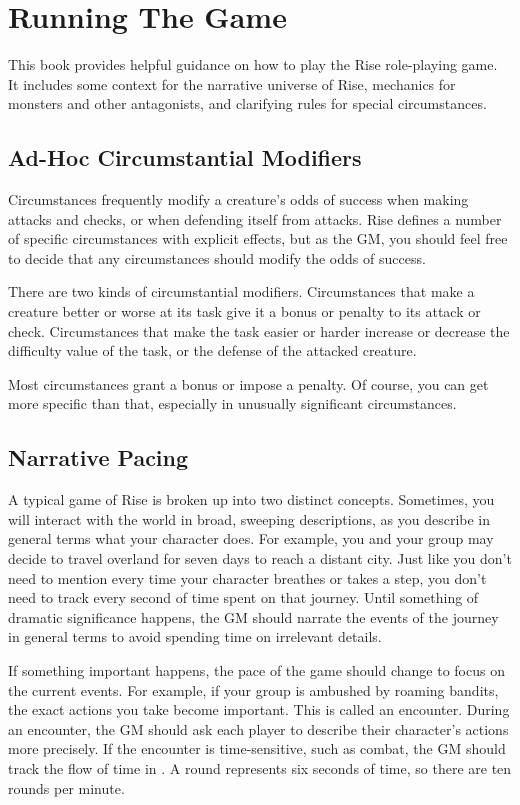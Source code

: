 \chapter{Running The Game}

This book provides helpful guidance on how to play the Rise role-playing game.
It includes some context for the narrative universe of Rise, mechanics for monsters and other antagonists, and clarifying rules for special circumstances.

\section{Ad-Hoc Circumstantial Modifiers}
    Circumstances frequently modify a creature's odds of success when making attacks and checks, or when defending itself from attacks.
    Rise defines a number of specific circumstances with explicit effects, but as the GM, you should feel free to decide that any circumstances should modify the odds of success.

    There are two kinds of circumstantial modifiers.
    Circumstances that make a creature better or worse at its task give it a bonus or penalty to its attack or check.
    Circumstances that make the task easier or harder increase or decrease the difficulty value of the task, or the defense of the attacked creature.

    Most circumstances grant a  bonus or impose a  penalty.
    Of course, you can get more specific than that, especially in unusually significant circumstances.

\section{Narrative Pacing}
    A typical game of Rise is broken up into two distinct concepts.
    Sometimes, you will interact with the world in broad, sweeping descriptions, as you describe in general terms what your character does.
    For example, you and your group may decide to travel overland for seven days to reach a distant city.
    Just like you don't need to mention every time your character breathes or takes a step, you don't need to track every second of time spent on that journey.
    Until something of dramatic significance happens, the GM should narrate the events of the journey in general terms to avoid spending time on irrelevant details.

    If something important happens, the pace of the game should change to focus on the current events.
    For example, if your group is ambushed by roaming bandits, the exact actions you take become important.
    This is called an encounter.
    During an encounter, the GM should ask each player to describe their character's actions more precisely.
    If the encounter is time-sensitive, such as combat, the GM should track the flow of time in .
    A round represents six seconds of time, so there are ten rounds per minute.


